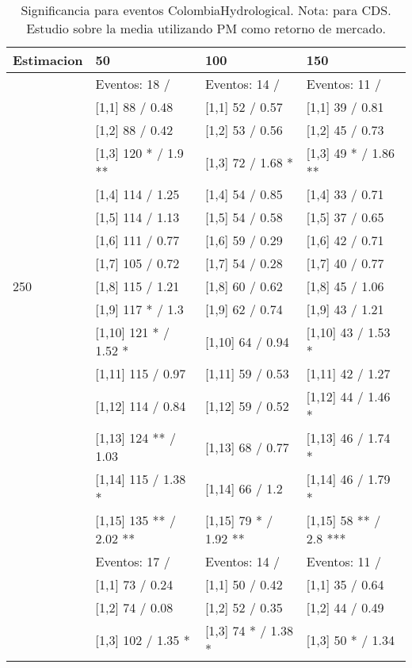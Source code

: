 \begin{table}

\caption{Significancia para eventos ColombiaHydrological. Nota: para CDS. Estudio sobre la media utilizando PM como retorno de mercado.}
\centering
\begin{tabular}[t]{llll}
\toprule
Estimacion & 50 & 100 & 150\\
\midrule
 & Eventos:  18 / & Eventos:  14 / & Eventos:  11 /\\
 & {}[1,1] 88  / 0.48 & {}[1,1] 52  / 0.57 & {}[1,1] 39  / 0.81\\
 & {}[1,2] 88  / 0.42 & {}[1,2] 53  / 0.56 & {}[1,2] 45  / 0.73\\
 & {}[1,3] 120 * / 1.9 ** & {}[1,3] 72  / 1.68 * & {}[1,3] 49 * / 1.86 **\\
 & {}[1,4] 114  / 1.25 & {}[1,4] 54  / 0.85 & {}[1,4] 33  / 0.71\\
\addlinespace
 & {}[1,5] 114  / 1.13 & {}[1,5] 54  / 0.58 & {}[1,5] 37  / 0.65\\
 & {}[1,6] 111  / 0.77 & {}[1,6] 59  / 0.29 & {}[1,6] 42  / 0.71\\
 & {}[1,7] 105  / 0.72 & {}[1,7] 54  / 0.28 & {}[1,7] 40  / 0.77\\
250 & {}[1,8] 115  / 1.21 & {}[1,8] 60  / 0.62 & {}[1,8] 45  / 1.06\\
 & {}[1,9] 117 * / 1.3 & {}[1,9] 62  / 0.74 & {}[1,9] 43  / 1.21\\
\addlinespace
 & {}[1,10] 121 * / 1.52 * & {}[1,10] 64  / 0.94 & {}[1,10] 43  / 1.53 *\\
 & {}[1,11] 115  / 0.97 & {}[1,11] 59  / 0.53 & {}[1,11] 42  / 1.27\\
 & {}[1,12] 114  / 0.84 & {}[1,12] 59  / 0.52 & {}[1,12] 44  / 1.46 *\\
 & {}[1,13] 124 ** / 1.03 & {}[1,13] 68  / 0.77 & {}[1,13] 46  / 1.74 *\\
 & {}[1,14] 115  / 1.38 * & {}[1,14] 66  / 1.2 & {}[1,14] 46  / 1.79 *\\
\addlinespace
 & {}[1,15] 135 ** / 2.02 ** & {}[1,15] 79 * / 1.92 ** & {}[1,15] 58 ** / 2.8 ***\\
 & Eventos:  17 / & Eventos:  14 / & Eventos:  11 /\\
 & {}[1,1] 73  / 0.24 & {}[1,1] 50  / 0.42 & {}[1,1] 35  / 0.64\\
 & {}[1,2] 74  / 0.08 & {}[1,2] 52  / 0.35 & {}[1,2] 44  / 0.49\\
 & {}[1,3] 102  / 1.35 * & {}[1,3] 74 * / 1.38 * & {}[1,3] 50 * / 1.34\\

\end{tabular}
\end{table}
